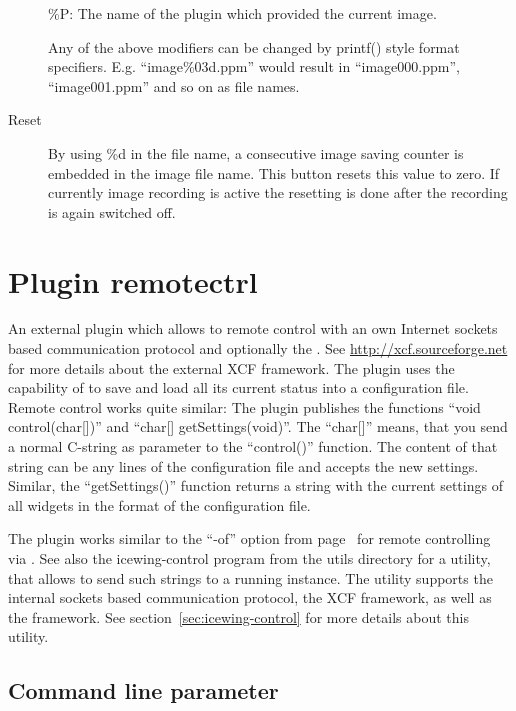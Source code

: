\begin{description}
\begin{tabbing}
    \%P\>:\> The name of the plugin which provided the current image.
  \end{tabbing}
  Any of the above modifiers can be changed by printf() style format
  specifiers. E.g. ``image\%03d.ppm'' would result in
  ``image000.ppm'', ``image001.ppm'' and so on as file names.
\item[Reset \Index{FilenameCounter}] By using \%d in the file name, a
  consecutive image saving counter is embedded in the image file
  name. This button resets this value to zero. If currently image
  recording is active the resetting is done after the recording is
  again switched off.
\end{description}

\section{Plugin remotectrl}
\label{sec:remotectrl}

An external plugin which allows to remote control \icewing{} with an
own Internet sockets based communication protocol and optionally the
. See \url{http://xcf.sourceforge.net} for more details
about the external XCF framework. The plugin uses the capability of
\icewing{} to save and load all its current status into a
configuration file. Remote control works quite similar: The plugin
publishes the functions ``void control(char[])'' and ``char[]
getSettings(void)''. The ``char[]'' means, that you send a normal
C-string as parameter to the ``control()'' function. The content of
that string can be any lines of the \icewing{} configuration file
and \icewing{} accepts the new settings. Similar, the
``getSettings()'' function returns a string with the current
settings of all widgets in the format of the configuration file.

The plugin works similar to the \icewing{} ``-of'' option from
page~ for remote controlling via \dacs{}.
See also the icewing-control program from the utils directory for a
utility, that allows to send such strings to a running \icewing{}
instance. The utility supports the internal sockets based
communication protocol, the XCF framework, as well as the \dacs{}
framework. See section~\ref{sec:icewing-control} for more details
about this utility.

\subsection{Command line parameter}


